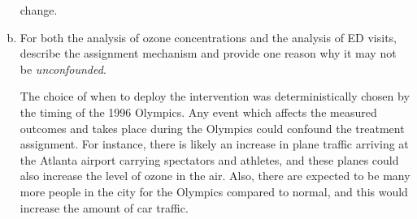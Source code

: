 \begin{enumerate}[(a)]
  change.
\item
  \begin{quoting}
    For both the analysis of ozone concentrations and the analysis of
    ED visits, describe the assignment mechanism and provide one
    reason why it may not be \emph{unconfounded}.
  \end{quoting}
  The choice of when to deploy the intervention was deterministically
  chosen by the timing of the 1996 Olympics.  Any event which affects
  the measured outcomes and takes place during the Olympics could
  confound the treatment assignment.  For instance, there is likely an
  increase in plane traffic arriving at the Atlanta airport carrying spectators and
  athletes, and these planes could also increase the level of ozone in
  the air.  Also, there are expected to be many more people in the
  city for the Olympics compared to normal, and this would increase
  the amount of car traffic.  
\end{enumerate}

